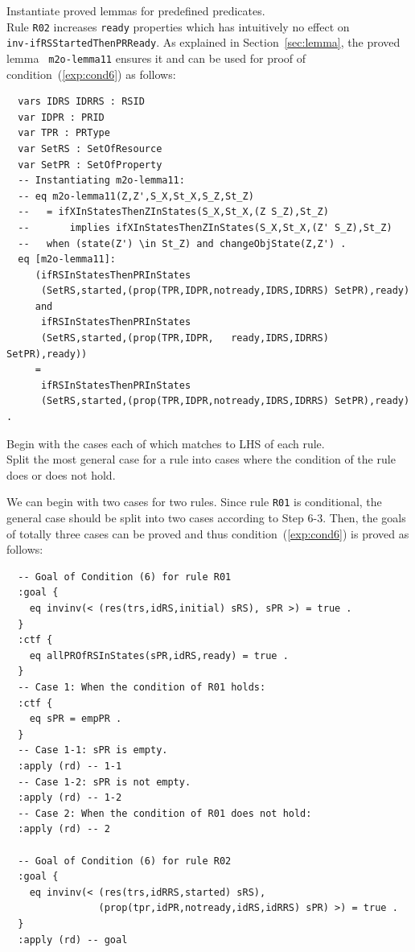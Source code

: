 \documentclass[12pt]{report}
\begin{document}
 Instantiate proved lemmas for predefined
predicates. \\ Rule {\tt R02} increases {\tt ready} properties which
has intuitively no effect on \\ {\tt inv-ifRSStartedThenPRReady}. As
explained in Section~\ref{sec:lemma}, the proved lemma {\tt
  m2o-lemma11} ensures it and can be used for proof of
condition~(\ref{exp:cond6}) as follows:
\small
\begin{verbatim}
  vars IDRS IDRRS : RSID 
  var IDPR : PRID
  var TPR : PRType
  var SetRS : SetOfResource
  var SetPR : SetOfProperty
  -- Instantiating m2o-lemma11:
  -- eq m2o-lemma11(Z,Z',S_X,St_X,S_Z,St_Z)
  --   = ifXInStatesThenZInStates(S_X,St_X,(Z S_Z),St_Z)
  --       implies ifXInStatesThenZInStates(S_X,St_X,(Z' S_Z),St_Z) 
  --   when (state(Z') \in St_Z) and changeObjState(Z,Z') .
  eq [m2o-lemma11]:
     (ifRSInStatesThenPRInStates
      (SetRS,started,(prop(TPR,IDPR,notready,IDRS,IDRRS) SetPR),ready)
     and
      ifRSInStatesThenPRInStates
      (SetRS,started,(prop(TPR,IDPR,   ready,IDRS,IDRRS) SetPR),ready))
     = 
      ifRSInStatesThenPRInStates
      (SetRS,started,(prop(TPR,IDPR,notready,IDRS,IDRRS) SetPR),ready) .
\end{verbatim}
\normalsize

\vspace{0.3cm}
 Begin with the cases each of which matches to
LHS of each rule. \\ 
 Split the most general case for a rule into
cases where the condition of the rule does or does not hold. 

We can begin with two cases for two rules. Since rule {\tt R01} is
conditional, the general case should be split into two cases according
to Step 6-3. Then, the goals of totally three cases can be proved and
thus condition~(\ref{exp:cond6}) is proved as follows:
\small
\begin{verbatim}
  -- Goal of Condition (6) for rule R01
  :goal {
    eq invinv(< (res(trs,idRS,initial) sRS), sPR >) = true .
  }
  :ctf {
    eq allPROfRSInStates(sPR,idRS,ready) = true .
  }
  -- Case 1: When the condition of R01 holds:
  :ctf {
    eq sPR = empPR .
  }
  -- Case 1-1: sPR is empty.
  :apply (rd) -- 1-1
  -- Case 1-2: sPR is not empty.
  :apply (rd) -- 1-2
  -- Case 2: When the condition of R01 does not hold:
  :apply (rd) -- 2

  -- Goal of Condition (6) for rule R02
  :goal {
    eq invinv(< (res(trs,idRRS,started) sRS),
                (prop(tpr,idPR,notready,idRS,idRRS) sPR) >) = true .
  }
  :apply (rd) -- goal
\end{verbatim}
\normalsize
\end{document}
